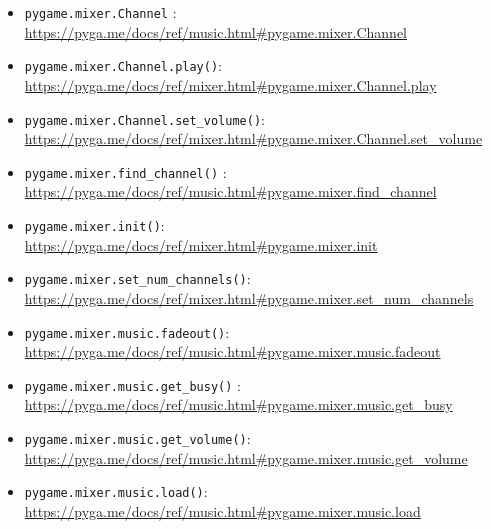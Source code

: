 \begin{pygbox}
\begin{itemize}
	\item\texttt{pygame.mixer.Channel} :
	\\ \url{https://pyga.me/docs/ref/music.html#pygame.mixer.Channel}

	\item \texttt{pygame.mixer.Channel.play()}:
	\\ \url{https://pyga.me/docs/ref/mixer.html#pygame.mixer.Channel.play}

	\item \texttt{pygame.mixer.Channel.set\_volume()}:
	\\ \url{https://pyga.me/docs/ref/mixer.html#pygame.mixer.Channel.set_volume}

	\item\texttt{pygame.mixer.find\_channel()} :
	\\ \url{https://pyga.me/docs/ref/music.html#pygame.mixer.find_channel}

	\item \texttt{pygame.mixer.init()}:
	\\ \url{https://pyga.me/docs/ref/mixer.html#pygame.mixer.init}

	\item \texttt{pygame.mixer.set\_num\_channels()}:
	\\ \url{https://pyga.me/docs/ref/mixer.html#pygame.mixer.set_num_channels}

	\item\texttt{pygame.mixer.music.fadeout()}:
	\\ \url{https://pyga.me/docs/ref/music.html#pygame.mixer.music.fadeout}

	\item\texttt{pygame.mixer.music.get\_busy()} :
	\\ \url{https://pyga.me/docs/ref/music.html#pygame.mixer.music.get_busy}

	\item \texttt{pygame.mixer.music.get\_volume()}:
	\\ \url{https://pyga.me/docs/ref/music.html#pygame.mixer.music.get_volume}

    \item \texttt{pygame.mixer.music.load()}:
	\\ \url{https://pyga.me/docs/ref/music.html#pygame.mixer.music.load}


\end{itemize}
\end{pygbox}
